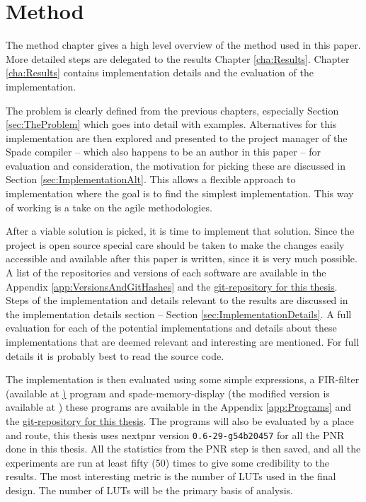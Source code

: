 \chapter{Method}
The method chapter gives a high level overview of the method used in this paper. More detailed steps are delegated to the results Chapter \ref{cha:Results}. Chapter \ref{cha:Results} contains implementation details and the evaluation of the implementation.

The problem is clearly defined from the previous chapters, especially Section \ref{sec:TheProblem} which goes into detail with examples. Alternatives for this implementation are then explored and presented to the project manager of the Spade compiler -- which also happens to be an author in this paper -- for evaluation and consideration, the motivation for picking these are discussed in Section \ref{sec:ImplementationAlt}. This allows a flexible approach to implementation where the goal is to find the simplest implementation. This way of working is a take on the agile methodologies.

After a viable solution is picked, it is time to implement that solution. Since the project is open source special care should be taken to make the changes easily accessible and available after this paper is written, since it is very much possible. A list of the repositories and versions of each software are available in the Appendix \ref{app:VersionsAndGitHashes} and the \href{https://github.com/FredTheDino/thesis-spade-lang}{git-repository for this thesis}. Steps of the implementation and details relevant to the results are discussed in the implementation details section -- Section \ref{sec:ImplementationDetails}. A full evaluation for each of the potential implementations and details about these implementations that are deemed relevant and interesting are mentioned. For full details it is probably best to read the source code. 

The implementation is then evaluated using some simple expressions, a FIR-filter (available at \href{https://github.com/FredTheDino/thesis-spade-lang/tree/main/messing/fir}) program and spade-memory-display (the modified version is available at \href{https://github.com/FredTheDino/spade-memory-display-wli-fork}) these programs are available in the Appendix \ref{app:Programs} and the \href{https://github.com/FredTheDino/thesis-spade-lang}{git-repository for this thesis}. The programs will also be evaluated by a place and route, this thesis uses nextpnr version \verb+0.6-29-g54b20457+ for all the PNR done in this thesis. All the statistics from the PNR step is then saved, and all the experiments are run at least fifty (50) times to give some credibility to the results. The most interesting metric is the number of LUTs used in the final design. The number of LUTs will be the primary basis of analysis.

